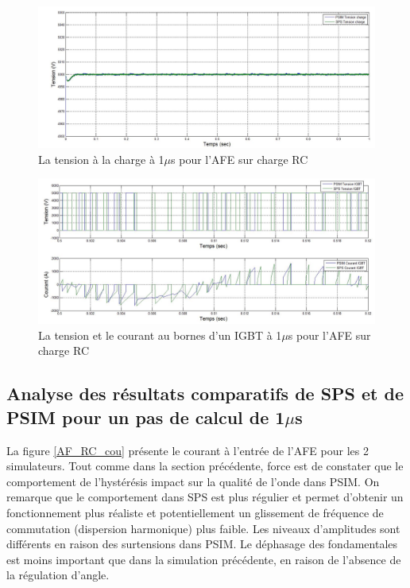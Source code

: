\begin{figure}[htb]
\centering
\includegraphics[scale=0.5]{fig/AFERC/vch.jpg}
\caption{La tension à la charge à 1$\mu$s pour l'AFE sur charge RC}
\label{AF_RC_ten}
\end{figure}



\begin{figure}[htb]
\centering
\includegraphics[scale=0.5]{fig/AFERC/IGBT.jpg}
\caption{La tension et le courant au bornes d'un IGBT à 1$\mu$s pour l'AFE sur charge RC}
\label{AF_RC_igbt}
\end{figure}

\clearpage

\subsection{Analyse des résultats comparatifs de SPS et de PSIM pour un pas de calcul de 1$\mu$s}

La figure \ref{AF_RC_cou} présente le courant à l'entrée de l'AFE pour les 2 simulateurs. Tout comme dans la section précédente, force est de constater que le comportement de l'hystérésis impact sur la qualité de l'onde dans PSIM. On remarque que le comportement dans SPS est plus régulier et permet d'obtenir un fonctionnement plus réaliste et potentiellement un glissement de fréquence de commutation (dispersion harmonique) plus faible. Les niveaux d'amplitudes sont différents en raison des surtensions dans PSIM. Le déphasage des fondamentales est moins important que dans la simulation précédente, en raison de l'absence de la régulation d'angle. 

